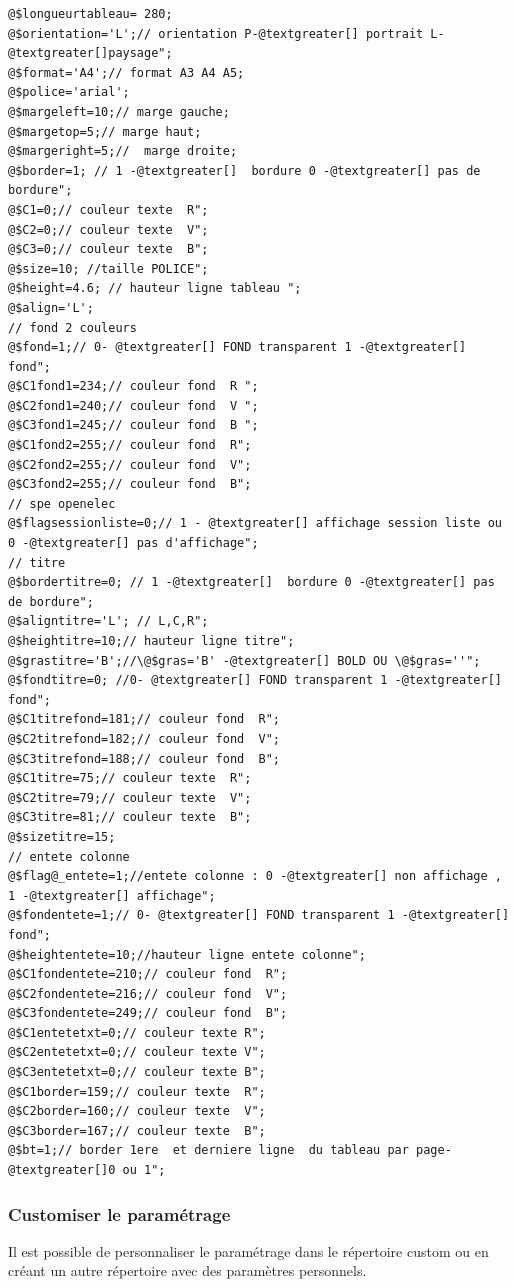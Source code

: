 \documentclass[letterpaper,10pt,french]{manual}
\begin{document}
\begin{Verbatim}[commandchars=@\[\]]
@$longueurtableau= 280;
@$orientation='L';// orientation P-@textgreater[] portrait L-@textgreater[]paysage";
@$format='A4';// format A3 A4 A5;
@$police='arial';
@$margeleft=10;// marge gauche;
@$margetop=5;// marge haut;
@$margeright=5;//  marge droite;
@$border=1; // 1 -@textgreater[]  bordure 0 -@textgreater[] pas de bordure";
@$C1=0;// couleur texte  R";
@$C2=0;// couleur texte  V";
@$C3=0;// couleur texte  B";
@$size=10; //taille POLICE";
@$height=4.6; // hauteur ligne tableau ";
@$align='L';
// fond 2 couleurs
@$fond=1;// 0- @textgreater[] FOND transparent 1 -@textgreater[] fond";
@$C1fond1=234;// couleur fond  R ";
@$C2fond1=240;// couleur fond  V ";
@$C3fond1=245;// couleur fond  B ";
@$C1fond2=255;// couleur fond  R";
@$C2fond2=255;// couleur fond  V";
@$C3fond2=255;// couleur fond  B";
// spe openelec
@$flagsessionliste=0;// 1 - @textgreater[] affichage session liste ou 0 -@textgreater[] pas d'affichage";
// titre
@$bordertitre=0; // 1 -@textgreater[]  bordure 0 -@textgreater[] pas de bordure";
@$aligntitre='L'; // L,C,R";
@$heightitre=10;// hauteur ligne titre";
@$grastitre='B';//\@$gras='B' -@textgreater[] BOLD OU \@$gras=''";
@$fondtitre=0; //0- @textgreater[] FOND transparent 1 -@textgreater[] fond";
@$C1titrefond=181;// couleur fond  R";
@$C2titrefond=182;// couleur fond  V";
@$C3titrefond=188;// couleur fond  B";
@$C1titre=75;// couleur texte  R";
@$C2titre=79;// couleur texte  V";
@$C3titre=81;// couleur texte  B";
@$sizetitre=15;
// entete colonne
@$flag@_entete=1;//entete colonne : 0 -@textgreater[] non affichage , 1 -@textgreater[] affichage";
@$fondentete=1;// 0- @textgreater[] FOND transparent 1 -@textgreater[] fond";
@$heightentete=10;//hauteur ligne entete colonne";
@$C1fondentete=210;// couleur fond  R";
@$C2fondentete=216;// couleur fond  V";
@$C3fondentete=249;// couleur fond  B";
@$C1entetetxt=0;// couleur texte R";
@$C2entetetxt=0;// couleur texte V";
@$C3entetetxt=0;// couleur texte B";
@$C1border=159;// couleur texte  R";
@$C2border=160;// couleur texte  V";
@$C3border=167;// couleur texte  B";
@$bt=1;// border 1ere  et derniere ligne  du tableau par page-@textgreater[]0 ou 1";
\end{Verbatim}


\subsubsection{Customiser le paramétrage}

Il est possible de personnaliser le paramétrage dans le répertoire custom ou en créant un autre répertoire avec des paramètres personnels.
\end{document}
